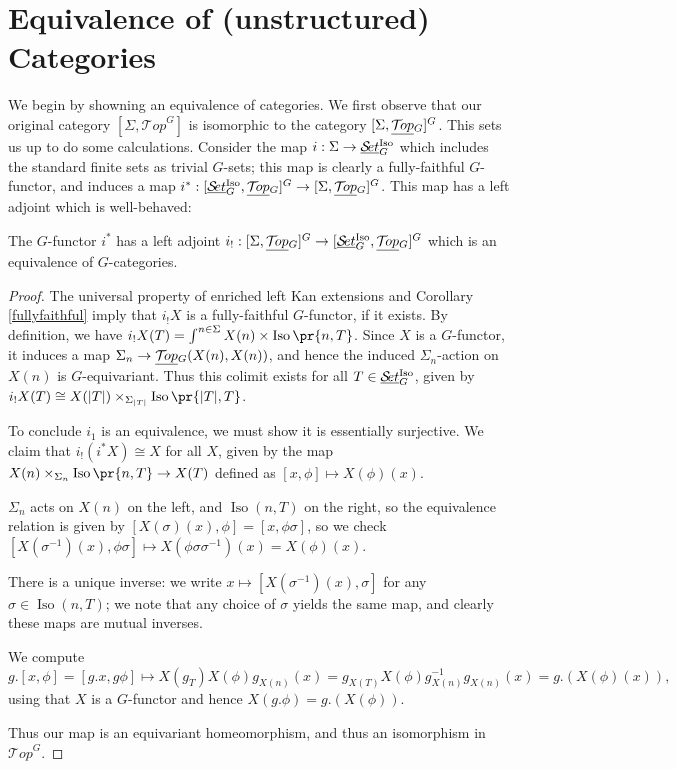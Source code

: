 \documentclass{report}
\newcommand{\Top}{\text{$\mathcal{T}\!op$}}
\newcommand{\Set}{\text{$\mathcal{S}\!et$}}
\DeclareMathOperator{\Iso}{Iso}
\newcommand{\iso}[1]{\text{$\Iso\pr{#1}$}}
\newcommand{\TopG}{\text{\underline{$\Top$}$_G$}}
\newcommand{\SetG}{\text{\underline{$\Set$}$_G^{\mbox{\scriptsize Iso}}$}}
\renewcommand{\ST}{\text{$[\SetG,\TopG]^G$}}
\begin{document}
\section{Equivalence of (unstructured) Categories}
We begin by showning an equivalence of categories. 
We first observe that our original category  $[\Sigma, \Top^G]$ is isomorphic to the category $[\Sigma,\TopG]^G$. This sets us up to do some calculations. Consider the map $i: \Sigma\to \SetG$ which includes the standard finite sets as trivial $G$-sets; this map is clearly a fully-faithful $G$-functor, and induces a map $i^*: \ST \to [\Sigma,\TopG]^G$. This map has a left adjoint which is well-behaved:
\begin{lemma}
  The $G$-functor $i^*$ has a left adjoint $i_!: [\Sigma,\TopG]^G\to\ST$ which is an equivalence of $G$-categories.
\end{lemma}
\begin{proof}
  The universal property of enriched left Kan extensions and Corollary \ref{fullyfaithful} imply that $i_!X$ is a fully-faithful $G$-functor, if it exists. By definition, we have $i_!X(T) = \int^{n\in\Sigma}X(n)\times\iso{n,T}$. Since $X$ is a $G$-functor, it induces a map $\Sigma_n\to\TopG(X(n),X(n))$, and hence the induced $\Sigma_n$-action on $X(n)$ is $G$-equivariant. Thus this colimit exists for all $T\in\SetG$, given by $i_!X(T) \cong X(|T|)\times_{\Sigma_{|T|}}\iso{|T|,T}$.   

  To conclude $i_1$ is an equivalence, we must show it is essentially surjective. We claim that $i_!(i^*X)\cong X$ for all $X$, given by the map $X(n)\times_{\Sigma_n}\iso{n,T}\to X(T)$ defined as $[x, \phi]\mapsto X(\phi)(x)$.
  \begin{description}\itemsep-4pt
  \item[well-defined] $\Sigma_n$ acts on $X(n)$ on the left, and $\Iso(n,T)$ on the right, so the equivalence relation is given by $[X(\sigma)(x), \phi] = [x,\phi\sigma]$, so we check $[X(\sigma^{-1})(x), \phi\sigma]\mapsto X(\phi\sigma\sigma^{-1})(x) = X(\phi)(x)$.
  \item[homeomorphism] There is a unique inverse: we write $x\mapsto [X(\sigma^{-1})(x), \sigma]$ for any $\sigma\in\Iso(n,T)$; we note that any choice of $\sigma$ yields the same map, and clearly these maps are mutual inverses.
  \item[equivariant] We compute
    \[g.[x, \phi]=[g.x,  g\phi] \mapsto X(g_T)X(\phi)g_{X(n)}(x) = g_{X(T)}X(\phi)g_{X(n)}^{-1}g_{X(n)}(x) = g.(X(\phi)(x)),\]
    using that $X$ is a $G$-functor and hence $X(g.\phi) = g.(X(\phi))$.   
  \end{description}
  Thus our map is an equivariant homeomorphism, and thus an isomorphism in $\Top^G$.
\end{proof}
\end{document}
